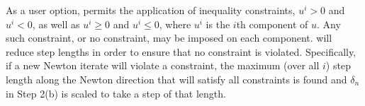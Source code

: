 As a user option, {\kinsol} permits the application of inequality
constraints, $u^i > 0$ and $u^i < 0$, as well as $u^i \geq 0$ and
$u^i \leq 0$, where $u^i$ is the $i$th component of $u$.  Any such
constraint, or no constraint, may be imposed on each component.
{\kinsol} will reduce step lengths in order to ensure that no
constraint is violated.  Specifically, if a new Newton iterate
will violate a constraint, the maximum (over all $i$) step length
along the Newton direction that will satisfy all constraints is
found and $\delta_n$ in Step 2(b) is scaled to take a step of that
length.


